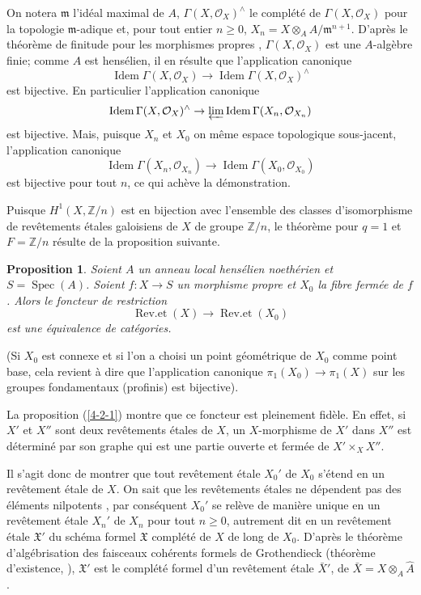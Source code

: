 \documentclass{article}
\DeclareMathOperator{\spec}{Spec}
\newcommand{\cO}{\mathcal{O}}
\newcommand{\dZ}{\mathbb{Z}}
\newcommand{\fm}{\mathfrak{m}}
\newcommand{\fX}{\mathfrak{X}}
\newtheorem{proposition}[subsubsection]{Proposition}
\begin{document}
On notera $\fm$ l'idéal maximal de $A$, $\Gamma(X,\cO_X)^\wedge$ le complété 
de $\Gamma(X,\cO_X)$ pour la topologie $\fm$-adique et, pour tout entier 
$n\geqslant 0$, $X_n=X\otimes_A A/\fm^{n+1}$. D'après le théorème de finitude 
pour les morphismes propres \cite[III.3.2]{8}, $\Gamma(X,\cO_X)$ est une 
$A$-algèbre finie; comme $A$ est hensélien, il en résulte que 
l'application canonique 
\[
  \operatorname{Idem} \Gamma(X,\cO_X) \to \operatorname{Idem}\Gamma(X,\cO_X)^\wedge
\]
est bijective. En particulier l'application canonique 
\[
  \operatorname{Idem} \Gamma(X,\cO_X)^\wedge \to \varprojlim \operatorname{Idem}\Gamma(X_n,\cO_{X_n})
\]
est bijective. Mais, puisque $X_n$ et $X_0$ on même espace topologique 
sous-jacent, l'application canonique 
\[
  \operatorname{Idem}\Gamma(X_n,\cO_{X_n}) \to \operatorname{Idem} \Gamma(X_0,\cO_{X_0})
\]
est bijective pour tout $n$, ce qui achève la démonstration. 

Puisque $H^1(X,\dZ/n)$ est en bijection avec l'ensemble des classes 
d'isomorphisme de revêtements étales galoisiens de $X$ de groupe $\dZ/n$, 
le théorème  pour $q=1$ et $F=\dZ/n$ résulte de la proposition suivante. 





\begin{proposition}\label{4-2-2}
Soient $A$ un anneau local hensélien noethérien et $S=\spec(A)$. Soient 
$f:X\to S$ un morphisme propre et $X_0$ la fibre fermée de $f$. Alors le 
foncteur de restriction 
\[
  \operatorname{Rev.et}(X) \to \operatorname{Rev.et}(X_0)
\]
est une équivalence de catégories. 
\end{proposition}

(Si $X_0$ est connexe et si l'on a choisi un point géométrique de $X_0$ 
comme point base, cela revient à dire que l'application canonique 
$\pi_1(X_0)\to \pi_1(X)$ sur les groupes fondamentaux (profinis) est 
bijective). 

La proposition (\ref{4-2-1}) montre que ce foncteur est pleinement fidèle. En 
effet, si $X'$ et $X''$ sont deux revêtements étales de $X$, un 
$X$-morphisme de $X'$ dans $X''$ est déterminé par son graphe qui est une 
partie ouverte et fermée de $X'\times_X X''$. 

Il s'agit donc de montrer que tout revêtement étale $X_0'$ de $X_0$ s'étend 
en un revêtement étale de $X$. On sait que les revêtements étales ne 
dépendent pas des éléments nilpotents \cite[chap. 1]{7}, par conséquent 
$X_0'$ se relève de manière unique en un revêtement étale $X_n'$ de 
$X_n$ pour tout $n\geqslant 0$, autrement dit en un revêtement étale 
$\fX'$ du schéma formel $\fX$ complété de $X$ de long de $X_0$. D'après 
le théorème d'algébrisation des faisceaux cohérents formels de 
Grothendieck (théorème d'existence, \cite[III.5]{8}), $\fX'$ est le 
complété formel d'un revêtement étale $\bar X'$, de 
$\bar X=X\otimes_A \hat A$. 
\end{document}

